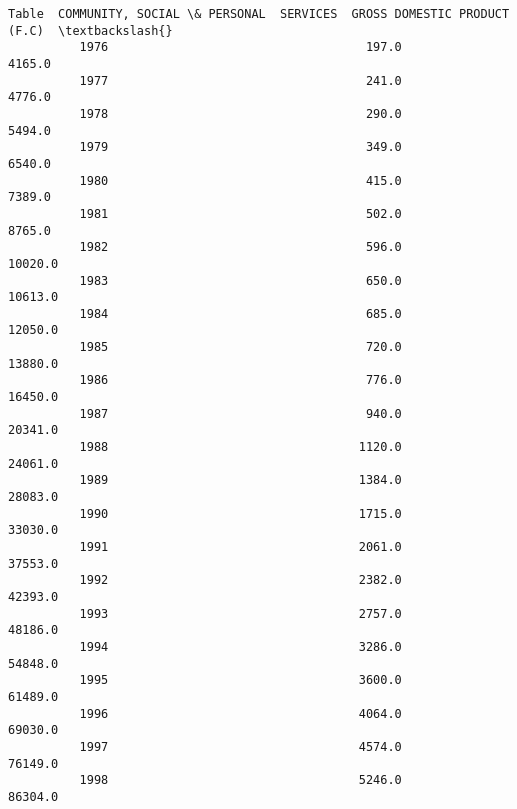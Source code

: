 \documentclass[11pt]{article}
\begin{document}
\begin{Verbatim}[commandchars=\\\{\}]
          Table  COMMUNITY, SOCIAL \& PERSONAL  SERVICES  GROSS DOMESTIC PRODUCT (F.C)  \textbackslash{}
          1976                                    197.0                        4165.0   
          1977                                    241.0                        4776.0   
          1978                                    290.0                        5494.0   
          1979                                    349.0                        6540.0   
          1980                                    415.0                        7389.0   
          1981                                    502.0                        8765.0   
          1982                                    596.0                       10020.0   
          1983                                    650.0                       10613.0   
          1984                                    685.0                       12050.0   
          1985                                    720.0                       13880.0   
          1986                                    776.0                       16450.0   
          1987                                    940.0                       20341.0   
          1988                                   1120.0                       24061.0   
          1989                                   1384.0                       28083.0   
          1990                                   1715.0                       33030.0   
          1991                                   2061.0                       37553.0   
          1992                                   2382.0                       42393.0   
          1993                                   2757.0                       48186.0   
          1994                                   3286.0                       54848.0   
          1995                                   3600.0                       61489.0   
          1996                                   4064.0                       69030.0   
          1997                                   4574.0                       76149.0   
          1998                                   5246.0                       86304.0   
          

\end{Verbatim}
\end{document}
